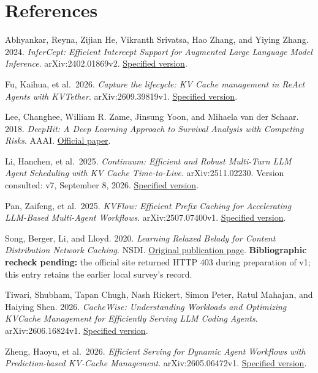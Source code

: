 \documentclass[
  english,
  10pt,
]{article}
\begin{document}
\clearpage

\section{References}\label{references}

Abhyankar, Reyna, Zijian He, Vikranth Srivatsa, Hao Zhang, and Yiying
Zhang. 2024. \emph{InferCept: Efficient Intercept Support for Augmented
Large Language Model Inference}. arXiv:2402.01869v2.
\href{https://arxiv.org/abs/2402.01869v2}{Specified version}.

Fu, Kaihua, et al.~2026. \emph{Capture the lifecycle: KV Cache
management in ReAct Agents with KVTether}. arXiv:2609.39819v1.
\href{https://arxiv.org/abs/2609.39819v1}{Specified version}.

Lee, Changhee, William R. Zame, Jinsung Yoon, and Mihaela van der
Schaar. 2018. \emph{DeepHit: A Deep Learning Approach to Survival
Analysis with Competing Risks}. AAAI.
\href{https://cdn.aaai.org/ojs/11842/11842-13-15370-1-2-20201228.pdf}{Official
paper}.

Li, Hanchen, et al.~2025. \emph{Continuum: Efficient and Robust
Multi-Turn LLM Agent Scheduling with KV Cache Time-to-Live}.
arXiv:2511.02230. Version consulted: v7, September 8, 2026.
\href{https://arxiv.org/abs/2511.02230v7}{Specified version}.

Pan, Zaifeng, et al.~2025. \emph{KVFlow: Efficient Prefix Caching for
Accelerating LLM-Based Multi-Agent Workflows}. arXiv:2507.07400v1.
\href{https://arxiv.org/abs/2507.07400v1}{Specified version}.

Song, Berger, Li, and Lloyd. 2020. \emph{Learning Relaxed Belady for
Content Distribution Network Caching}. NSDI.
\href{https://www.usenix.org/conference/nsdi20/presentation/song}{Original
publication page}. \textbf{Bibliographic recheck pending:} the official
site returned HTTP 403 during preparation of v1; this entry retains the
earlier local survey's record.

Tiwari, Shubham, Tapan Chugh, Nash Rickert, Simon Peter, Ratul Mahajan,
and Haiying Shen. 2026. \emph{CacheWise: Understanding Workloads and
Optimizing KVCache Management for Efficiently Serving LLM Coding
Agents}. arXiv:2606.16824v1.
\href{https://arxiv.org/abs/2606.16824v1}{Specified version}.

Zheng, Haoyu, et al.~2026. \emph{Efficient Serving for Dynamic Agent
Workflows with Prediction-based KV-Cache Management}.
arXiv:2605.06472v1. \href{https://arxiv.org/abs/2605.06472v1}{Specified
version}.
\end{document}
